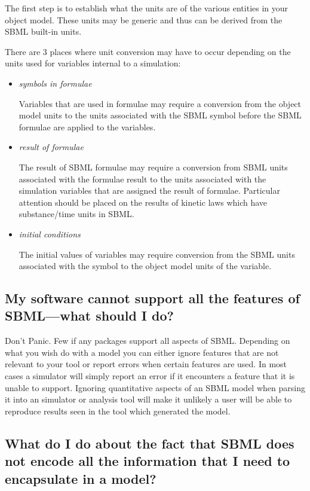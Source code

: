 \documentclass{sbmlfaq}
\begin{document}
The first step is to establish what the units are of the various entities in your object model.
These units may be generic and thus can be derived from the SBML built-in units.

There are 3 places where unit conversion may have to occur depending on the units used for variables internal to a simulation:

\begin{itemize}

\item \emph{symbols in formulae}

Variables that are used in formulae may require a conversion from the object model units to the units associated with the SBML symbol
before the SBML formulae are applied to the variables.  

\item \emph{result of formulae}

The result of SBML formulae may require a conversion from SBML units associated with the formulae result to the units associated
with the simulation variables that are assigned the result of formulae.  Particular attention should be placed on the
results of kinetic laws which have substance/time units in SBML.

\item \emph{initial conditions}

The initial values of variables may require conversion from the SBML units associated with the symbol to the object model units of
the variable.

\end{itemize}

\subsection{My software cannot support all the features of SBML---what should I do?}

Don't Panic.  Few if any packages support all aspects of SBML.  
Depending on what you wish do with a model you can either
ignore features that are not relevant to your tool or report errors
when certain features are used.  In most cases a simulator will 
simply report an error if it encounters a feature
that it is unable to support.  Ignoring quantitative aspects of an SBML
model when parsing it into an simulator or analysis tool will make it unlikely a user will be able to reproduce 
results seen in the tool which generated the model.

\subsection{What do I do about the fact that SBML does not encode all the
  information that I need to encapsulate in a model?}
\end{document}

